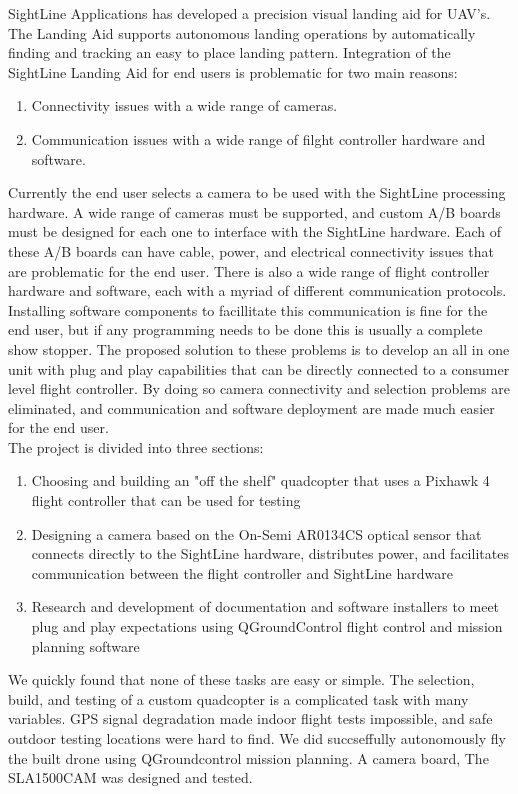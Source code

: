 \documentclass[11pt]{article}
\begin{document}
SightLine Applications has developed a precision visual landing aid for UAV's. The Landing Aid supports autonomous landing operations by automatically finding and tracking an easy to place landing pattern. Integration of the SightLine Landing Aid for end users is problematic for two main reasons: 
\begin{enumerate}
\item Connectivity issues with a wide range of cameras. 
\item Communication issues with a wide range of filght controller hardware and software.
\end{enumerate} 
Currently the end user selects a camera to be used with the SightLine processing hardware. A wide range of cameras must be supported, and custom A/B boards must be designed for each one to interface with the SightLine hardware. Each of these A/B boards can have cable, power, and electrical connectivity issues that are problematic for the end user.
There is also a wide range of flight controller hardware and software, each with a myriad of different communication protocols. Installing software components to facillitate this communication is fine for the end user, but if any programming needs to be done this is usually a complete show stopper. The proposed solution to these problems is to develop an all in one unit with plug and play capabilities that can be directly connected to a consumer level flight controller. By doing so camera connectivity and selection problems are eliminated, and communication and software deployment are made much easier for the end user.
 \\
The project is divided into three sections:
\begin{enumerate}
 \item Choosing and building an "off the shelf" quadcopter that uses a Pixhawk 4 flight controller that can be used for testing
 \item Designing a camera based on the On-Semi AR0134CS optical sensor that connects directly to the SightLine hardware, distributes power, and facilitates communication  between the flight controller and SightLine hardware
 \item Research and development of documentation and software installers to meet plug and play expectations using QGroundControl flight control and mission planning software
\end{enumerate}

We quickly found that none of these tasks  are easy or simple. The selection, build, and testing of a custom quadcopter is a complicated task with many variables. GPS signal degradation made indoor flight tests impossible, and safe outdoor testing locations were hard to find. We did succseffully autonomously fly the built drone using QGroundcontrol mission planning. A camera board, The SLA1500CAM was designed and tested. 
\end{document}
